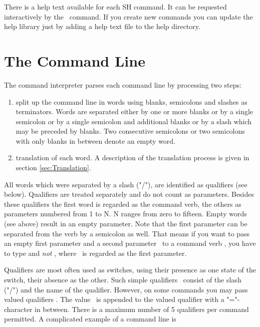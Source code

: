 There is a help text available for each SH command.  It can be
requested interactively by the \ command.  If you create
new commands you can update the help library just by adding a help
text file to the help directory.



\section{The Command Line}

The command interpreter parses each command line by processing
two steps:
\begin{enumerate}
\item split up the command line in words using blanks, semicolons
      and slashes
      as terminators.  Words are separated either by one or
      more blanks or by a single semicolon or by a single
      semicolon and additional blanks or by a slash which may be
      preceded by blanks.  Two consecutive semicolons
      or two semicolons with only blanks in between denote an
      empty word.
\item translation of each word.  A description of the translation
      process is given in section \ref{sec:Translation}.
\end{enumerate}
All words which were separated by a slash ("/"), are identified
as qualifiers (see below).
Qualifiers are treated separately and do not count as parameters.
Besides these qualifiers the first word is regarded as the command
verb, the others as parameters numbered from 1 to N.  N ranges
from zero to fifteen.  Empty words (see above) result in
an empty parameter.  Note that the first parameter can
be separated from the verb by a semicolon as well.  That means
if you want to pass an empty first parameter and a second
parameter \ to a command verb , you have to
type  and {\em not} , where \
is regarded as the first parameter.

Qualifiers are most often used as switches, using their presence
as one state of the switch, their absence as the other.  Such simple
qualifiers \exm{/SimpleQual}\ consist of the slash ("/") and
the name of the qualifier.  However, on some commands you may
pass valued qualifiers .  The value
\ is appended to the valued qualifier with a "="-character
in between.  There is a maximum number of 5 qualifiers per command
permitted.  A complicated example of a command line is

